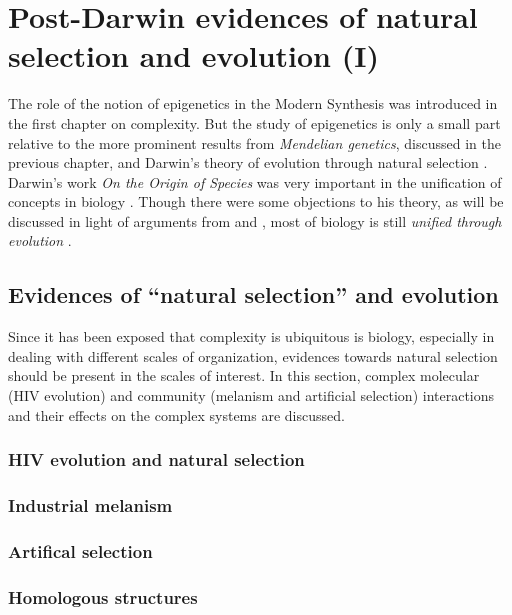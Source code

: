 \chapter{Post-Darwin evidences of natural selection and evolution (I)}

The role of the notion of epigenetics in the Modern Synthesis \cite{Baedke2013, Goldberg2007} was introduced in the first chapter on complexity.
But the study of epigenetics is only a small part relative to the more prominent results from \emph{Mendelian genetics}, discussed in the previous chapter, and Darwin's theory of evolution through natural selection \cite{Ridley}.
Darwin's work \textit{On the Origin of Species} was very important in the unification of concepts in biology \cite{biomain}.
Though there were some objections to his theory, as will be discussed in light of arguments from  and , most of biology is still \textit{unified through evolution} \cite{Ridley}.

\section{Evidences of ``natural selection'' and evolution}

Since it has been exposed that complexity is ubiquitous is biology, especially in dealing with different scales of organization, evidences towards natural selection should be present in the scales of interest.
In this section, complex molecular (HIV evolution) and community (melanism and artificial selection) interactions and their effects on the complex systems are discussed.

\subsection{HIV evolution and natural selection} %
\subsection{Industrial melanism} %
\subsection{Artifical selection} %
\subsection{Homologous structures} %

